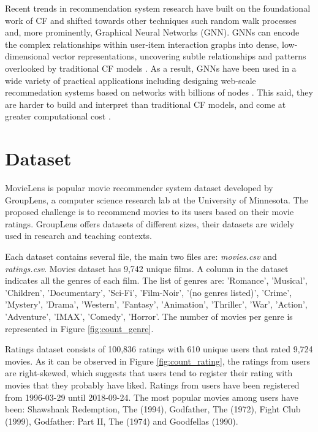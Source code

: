 \documentclass[12pt]{article}
\numberwithin{equation}{section}
\begin{document}
Recent trends in recommendation system research have built on the foundational work of CF and shifted towards other techniques such random walk processes \cite{prob_s} and, more prominently, Graphical Neural Networks (GNN). GNNs can encode the complex relationships within user-item interaction graphs into dense, low-dimensional vector representations,  uncovering subtle relationships and patterns overlooked by traditional CF models . As a result, GNNs have been used in a wide variety of practical applications including designing web-scale recommedation systems based on networks with billions of nodes \cite{GNNwebscale}. This said, they are harder to build and interpret than traditional CF models, and come at greater computational cost \cite{collab_f}. 

\section{Dataset}

MovieLens is popular movie recommender system dataset developed by GroupLens, a computer science research lab at the University of Minnesota. The proposed challenge is to recommend movies to its users based on their movie ratings. GroupLens offers datasets of different sizes, their datasets are widely used in research and teaching contexts.

Each dataset contains several file, the main two files are: \textit{movies.csv} and \textit{ratings.csv}. Movies dataset has 9,742 unique films. A column in the dataset indicates all the genres of each film. The list of genres are: 'Romance', 'Musical', 'Children', 'Documentary', 'Sci-Fi', 'Film-Noir', '(no genres listed)', 'Crime', 'Mystery', 'Drama', 'Western', 'Fantasy', 'Animation', 'Thriller', 'War', 'Action', 'Adventure', 'IMAX', 'Comedy', 'Horror'. The number of movies per genre is represented in Figure \ref{fig:count_genre}.

Ratings dataset consists of 100,836 ratings with 610 unique users that rated 9,724 movies. As it can be observed in Figure \ref{fig:count_rating}, the ratings from users are right-skewed, which suggests that users tend to register their rating with movies that they probably have liked. Ratings from users have been registered from 1996-03-29 until 2018-09-24. The most popular movies among users have been: Shawshank Redemption, The (1994), Godfather, The (1972), Fight Club (1999), Godfather: Part II, The (1974) and Goodfellas (1990).
\end{document}
